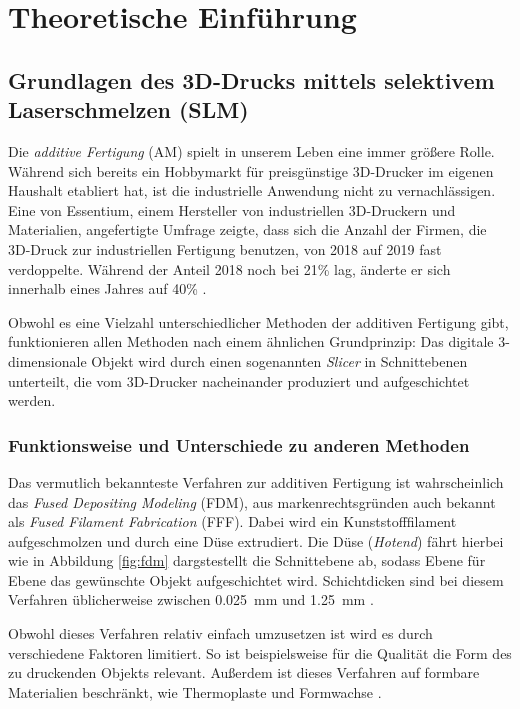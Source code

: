 \chapter{Theoretische Einführung}



\section{Grundlagen des 3D-Drucks mittels selektivem Laserschmelzen (SLM)}
	Die \emph{additive Fertigung} (AM) spielt in unserem Leben eine immer größere Rolle. Während
	sich bereits ein Hobbymarkt für preisgünstige 3D-Drucker im eigenen Haushalt etabliert hat, ist
	die industrielle Anwendung nicht zu vernachlässigen. Eine von Essentium, einem Hersteller von
	industriellen 3D-Druckern und Materialien, angefertigte Umfrage zeigte, dass sich die Anzahl der
	Firmen, die 3D-Druck zur industriellen Fertigung benutzen, von 2018 auf 2019 fast verdoppelte.
	Während der Anteil 2018 noch bei 21\% lag, änderte er sich innerhalb eines Jahres auf 40\%
	\cite{stevenson2019survey}.

	Obwohl es eine Vielzahl unterschiedlicher Methoden der additiven Fertigung gibt, funktionieren
	allen Methoden nach einem ähnlichen Grundprinzip: Das digitale 3-dimension\-ale Objekt wird durch
	einen sogenannten \emph{Slicer} in Schnittebenen unterteilt, die vom 3D-Drucker nacheinander
	produziert und aufgeschichtet werden.

	\subsection{Funktionsweise und Unterschiede zu anderen Methoden}
		Das vermutlich bekannteste Verfahren zur additiven Fertigung ist wahrscheinlich das
		\emph{Fused Depositing Modeling} (FDM), aus markenrechtsgründen auch bekannt als
		\emph{Fused Filament Fabrication} (FFF). Dabei wird ein Kunststofffilament aufgeschmolzen
		und durch eine Düse extrudiert. Die Düse (\emph{Hotend}) fährt hierbei wie in Abbildung
		\ref{fig:fdm} dargstestellt die Schnittebene ab, sodass Ebene für Ebene das gewünschte
		Objekt aufgeschichtet wird. Schichtdicken sind bei diesem Verfahren üblicherweise zwischen
		\SI{0,025}{\milli\meter} und \SI{1,25}{\milli\meter} \cite{wikipedia2021fused}.

		Obwohl dieses Verfahren relativ einfach umzusetzen ist wird es durch verschiedene Faktoren
		limitiert. So ist beispielsweise für die Qualität die Form des zu druckenden Objekts relevant.
		Außerdem ist dieses Verfahren auf formbare Materialien beschränkt, wie Thermoplaste und
		Formwachse \cite{wikipedia2021fused}.

